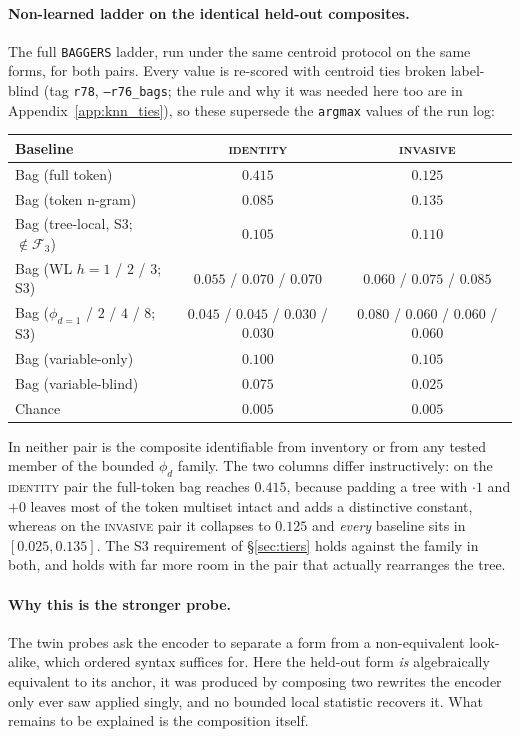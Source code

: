 \paragraph{Non-learned ladder on the identical held-out composites.} The full \texttt{BAGGERS} ladder, run under the same centroid protocol on the same forms, for both pairs. Every value is re-scored with centroid ties broken label-blind (tag \texttt{r78}, \texttt{--r76\_bags}; the rule and why it was needed here too are in Appendix~\ref{app:knn_ties}), so these supersede the \texttt{argmax} values of the run log:
\begin{center}\small
\begin{tabular}{lcc}
\toprule
Baseline & \textsc{identity} & \textsc{invasive} \\
\midrule
Bag (full token) & $0.415$ & $0.125$ \\
Bag (token n-gram) & $0.085$ & $0.135$ \\
Bag (tree-local, S3; $\notin\mathcal{F}_3$) & $0.105$ & $0.110$ \\
Bag (WL $h{=}1$ / $2$ / $3$; S3) & $0.055$ / $0.070$ / $0.070$ & $0.060$ / $0.075$ / $0.085$ \\
Bag ($\phi_{d=1}$ / $2$ / $4$ / $8$; S3) & $0.045$ / $0.045$ / $0.030$ / $0.030$ & $0.080$ / $0.060$ / $0.060$ / $0.060$ \\
Bag (variable-only) & $0.100$ & $0.105$ \\
Bag (variable-blind) & $0.075$ & $0.025$ \\
\midrule
Chance & $0.005$ & $0.005$ \\
\bottomrule
\end{tabular}
\end{center}
In neither pair is the composite identifiable from inventory or from any tested member of the bounded $\phi_d$ family. The two columns differ instructively: on the \textsc{identity} pair the full-token bag reaches $0.415$, because padding a tree with $\cdot 1$ and $+0$ leaves most of the token multiset intact and adds a distinctive constant, whereas on the \textsc{invasive} pair it collapses to $0.125$ and \emph{every} baseline sits in $[0.025, 0.135]$. The S3 requirement of \S\ref{sec:tiers} holds against the family in both, and holds with far more room in the pair that actually rearranges the tree.

\paragraph{Why this is the stronger probe.} The twin probes ask the encoder to separate a form from a non-equivalent look-alike, which ordered syntax suffices for. Here the held-out form \emph{is} algebraically equivalent to its anchor, it was produced by composing two rewrites the encoder only ever saw applied singly, and no bounded local statistic recovers it. What remains to be explained is the composition itself.

